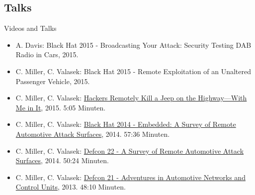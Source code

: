 \subsection{Talks}
\begin{frame}{Videos and Talks}
    \begin{itemize}
        \item A. Davis: Black Hat 2015 - Broadcasting Your Attack: Security Testing DAB Radio in Cars, 2015.
        \item C. Miller, C. Valasek: Black Hat 2015 - Remote Exploitation of an Unaltered Passenger Vehicle, 2015.
        \item C. Miller, C. Valasek: \href{http://www.wired.com/2015/07/hackers-remotely-kill-jeep-highway/}{Hackers Remotely Kill a Jeep on the Highway—With Me in It}, 2015. 5:05 Minuten.
        \item C. Miller, C. Valasek: \href{https://www.youtube.com/watch?v=mNhFGJVq2HE}{Black Hat 2014 - Embedded: A Survey of Remote Automotive Attack Surfaces}, 2014. 57:36 Minuten.
        \item C. Miller, C. Valasek: \href{https://www.youtube.com/watch?v=tnYO4U0h_wY}{Defcon 22 - A Survey of Remote Automotive Attack Surfaces}, 2014. 50:24 Minuten.
        \item C. Miller, C. Valasek: \href{https://www.youtube.com/watch?v=MEYCU62yeYk}{Defcon 21 - Adventures in Automotive Networks and Control Units}, 2013. 48:10 Minuten.
    \end{itemize}
\end{frame}